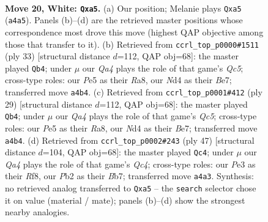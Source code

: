 \documentclass[11pt]{article}
\begin{document}
\clearpage

\begin{figure}[p]\centering
\begin{subfigure}{0.46\textwidth}\centering
\resizebox{\linewidth}{!}{%
\newchessgame
\chessboard[
  setfen={1rbrn1k1/p1p1qp2/6p1/n1PpP2p/Q2N4/1p2P1P1/PP1B1P1P/2K1RBR1 w - - 0 20},
  showmover=false,
  pgfstyle=straightmove, color=movearrow, markmove={a4-a5}
]}
\caption{}
\end{subfigure}\hfill
\begin{subfigure}{0.46\textwidth}\centering
\resizebox{\linewidth}{!}{%
\newchessgame
\chessboard[
  setfen={r3k2r/1p2bpp1/p2pbn1p/P1N1p3/2q1P1PP/2N1BP2/1PP5/R2QK2R b KQkq - 6 17},
  showmover=false,
  pgfstyle=straightmove, color=movearrow, markmove={c4-b4}
]}
\caption{}
\end{subfigure}
\\[4pt]
\begin{subfigure}{0.46\textwidth}\centering
\resizebox{\linewidth}{!}{%
\newchessgame
\chessboard[
  setfen={r3k2r/1p2bpp1/p2pbn1p/P1N1p3/2q1P1PP/2N1BP2/1PP5/R2QK2R b KQkq - 2 15},
  showmover=false,
  pgfstyle=straightmove, color=movearrow, markmove={c4-b4}
]}
\caption{}
\end{subfigure}\hfill
\begin{subfigure}{0.46\textwidth}\centering
\resizebox{\linewidth}{!}{%
\newchessgame
\chessboard[
  setfen={4rrk1/1b3p1p/pp3bp1/2q2P1n/P2Np3/2N1B2Q/1PP3PP/3R1R1K b - - 3 24},
  showmover=false,
  pgfstyle=straightmove, color=movearrow, markmove={c5-c4}
]}
\caption{}
\end{subfigure}
\caption{\textbf{Move 20, White: \texttt{Qxa5}.} (a) Our position; Melanie plays \texttt{Qxa5} (\texttt{a4a5}). Panels (b)--(d) are the retrieved master positions whose correspondence most drove this move (highest QAP objective among those that transfer to it). (b) Retrieved from \texttt{ccrl\_top\_p0000\#1511} (ply 33) [structural distance $d$=112, QAP obj=68]: the master played \texttt{Qb4}; under $\mu$ our \emph{Qa4} plays the role of that game's \emph{Qc5}; cross-type roles: our \emph{P}e5 as their \emph{R}a8, our \emph{N}d4 as their \emph{B}e7; transferred move \texttt{a4b4}. (c) Retrieved from \texttt{ccrl\_top\_p0001\#412} (ply 29) [structural distance $d$=112, QAP obj=68]: the master played \texttt{Qb4}; under $\mu$ our \emph{Qa4} plays the role of that game's \emph{Qc5}; cross-type roles: our \emph{P}e5 as their \emph{R}a8, our \emph{N}d4 as their \emph{B}e7; transferred move \texttt{a4b4}. (d) Retrieved from \texttt{ccrl\_top\_p0002\#243} (ply 47) [structural distance $d$=104, QAP obj=68]: the master played \texttt{Qc4}; under $\mu$ our \emph{Qa4} plays the role of that game's \emph{Qc4}; cross-type roles: our \emph{P}e3 as their \emph{R}f8, our \emph{P}b2 as their \emph{B}b7; transferred move \texttt{a4a3}. Synthesis: no retrieved analog transferred to \texttt{Qxa5} -- the \texttt{search} selector chose it on value (material / mate); panels (b)--(d) show the strongest nearby analogies.}
\label{fig:thought-m38}
\end{figure}
\end{document}

